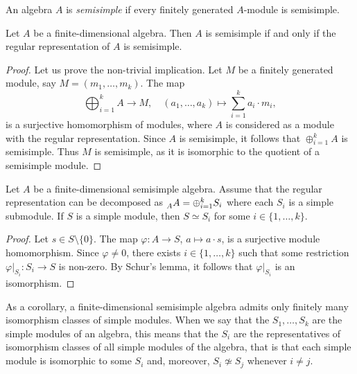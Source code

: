 \begin{definition}
    An algebra $A$ is \emph{semisimple} if every finitely generated $A$-module is semisimple. 
\end{definition}

\begin{proposition}
Let $A$ be a finite-dimensional algebra. Then $A$ is semisimple if and only if 
the regular representation of $A$ is semisimple. 
\end{proposition}

\begin{proof}
Let us prove the non-trivial implication. Let $M$ be a finitely generated module, say $M=(m_1,\dots,m_k)$. 
The map
\[
\bigoplus_{i=1}^k A\to M,\quad
(a_1,\dots,a_k)\mapsto \sum_{i=1}^k a_i\cdot m_i,
\]
is a surjective homomorphism of modules, where $A$ is considered as a module with the regular
representation. Since 
$A$ is semisimple, it follows that $\oplus_{i=1}^kA$ is semisimple. 
Thus $M$ is semisimple, as it is isomorphic to the quotient of a semisimple module.
\end{proof}

\begin{theorem}
Let $A$ be a finite-dimensional semisimple algebra. 
Assume that the regular representation can be decomposed as $\prescript{}{A}A=\oplus_{i=1}^k S_i$ where each $S_i$ is a simple submodule.  
If $S$ is a simple module, then $S\simeq S_i$ for some $i\in\{1,\dots,k\}$. 
\end{theorem}

\begin{proof}
Let $s\in S\setminus\{0\}$. The map $\varphi\colon A\to S$, $a\mapsto a\cdot s$, is a surjective module homomorphism. Since 
$\varphi\ne 0$, there exists $i\in\{1,\dots,k\}$ such that some restriction 
$\varphi|_{S_i}\colon S_i\to S$ is non-zero. By Schur's lemma, it follows that  
$\varphi|_{S_i}$ is an isomorphism.   	
\end{proof}

As a corollary, a finite-dimensional semisimple algebra admits 
only finitely many isomorphism classes of simple modules. When we say that 
the $S_1,\dots,S_k$ are the simple modules of an algebra, this means that the $S_i$ are the representatives
of isomorphism classes of all simple modules of the algebra, that is that each simple module is isomorphic to
some $S_i$ and, moreover,  
$S_i\not\simeq S_j$ whenever $i\ne j$. 
